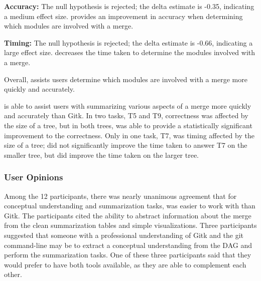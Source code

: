 \begin{itemize}
    \textbf{Accuracy:} The null hypothesis is rejected; the delta
    estimate is -0.35, indicating a medium effect size. \tool provides
    an improvement in accuracy when determining which modules are
    involved with a merge.

    \textbf{Timing:} The null hypothesis is rejected; the delta estimate
    is -0.66, indicating a large effect size. \tool decreases the time
    taken to determine the modules involved with a merge.

    Overall, \tool assists users determine which modules are involved
    with a merge more quickly and accurately.

\end{itemize}

\tool is able to assist users with summarizing various aspects of a
merge more quickly and accurately than Gitk. In two tasks, T5 and T9,
correctness was affected by the size of a tree, but in both trees, \tool
was able to provide a statistically significant improvement to the
correctness. Only in one task, T7, was timing affected by the size of a
tree; \tool did not significantly improve the time taken to answer T7 on
the smaller tree, but did improve the time taken on the larger tree.

\subsubsection{User Opinions}
\label{sub:user_opinions}

Among the 12 participants, there was nearly unanimous agreement that
for conceptual understanding and summarization tasks, \tool was easier
to work with than Gitk. The participants cited the ability to abstract
information about the merge from the clean summarization tables and
simple visualizations. Three participants suggested that someone with a
professional understanding of Gitk and the git command-line may be to
extract a conceptual understanding from the DAG and perform the
summarization tasks. One of these three participants said that they
would prefer to have both tools available, as they are able to
complement each other.

